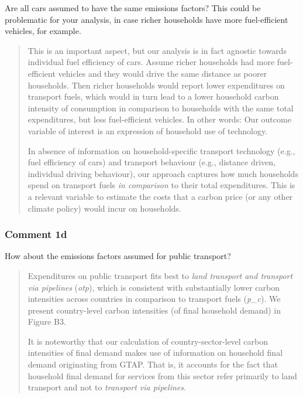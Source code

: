 \documentclass[11pt]{article}
\newenvironment{response}
{\begin{quote}\color{black}}
{\end{quote}}
\begin{document}
\begin{commentbox}
    Are all cars assumed to have the same emissions factors? This could be problematic for your analysis, in case richer households have more fuel-efficient vehicles, for example.
\end{commentbox}

\begin{response}
    This is an important aspect, but our analysis is in fact agnostic towards individual fuel efficiency of cars. Assume richer households had more fuel-efficient vehicles and they would drive the same distance as poorer households. Then richer households would report lower expenditures on transport fuels, which would in turn lead to a lower household carbon intensity of consumption in comparison to households with the same total expenditures, but less fuel-efficient vehicles. In other words: Our outcome variable of interest is an expression of household use of technology.

    In absence of information on household-specific transport technology (e.g., fuel efficiency of cars) and transport behaviour (e.g., distance driven, individual driving behaviour), our approach captures how much households spend on transport fuels \textit{in comparison} to their total expenditures. This is a relevant variable to estimate the costs that a carbon price (or any other climate policy) would incur on households.
\end{response}

\subsubsection*{Comment 1d}\label{comment_R2_1d}

\begin{commentbox}
    How about the emissions factors assumed for public transport?
\end{commentbox}

\begin{response}
    Expenditures on public transport fits best to \textit{land transport and transport via pipelines} (\textit{otp}), which is consistent with substantially lower carbon intensities across countries in comparison to transport fuels (\textit{p\_c}). We present country-level carbon intensities (of final household demand) in Figure B3.

    It is noteworthy that our calculation of country-sector-level carbon intensities of final demand makes use of information on household final demand originating from GTAP. That is, it accounts for the fact that household final demand for services from this sector refer primarily to {land transport} and not to \textit{transport via pipelines}.
\end{response}
\end{document}
